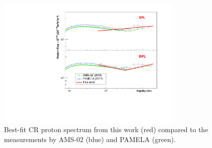 \begin{figure}[h!]
    \centering
    \includegraphics[width=0.8\textwidth]{img/ProtonSpectrumModelMeasurement.pdf}
    \caption{Best-fit CR proton spectrum from this work (red) compared to the measurements by AMS-02 (blue) and PAMELA (green).}
    \label{fig:proton-flux}
\end{figure}

